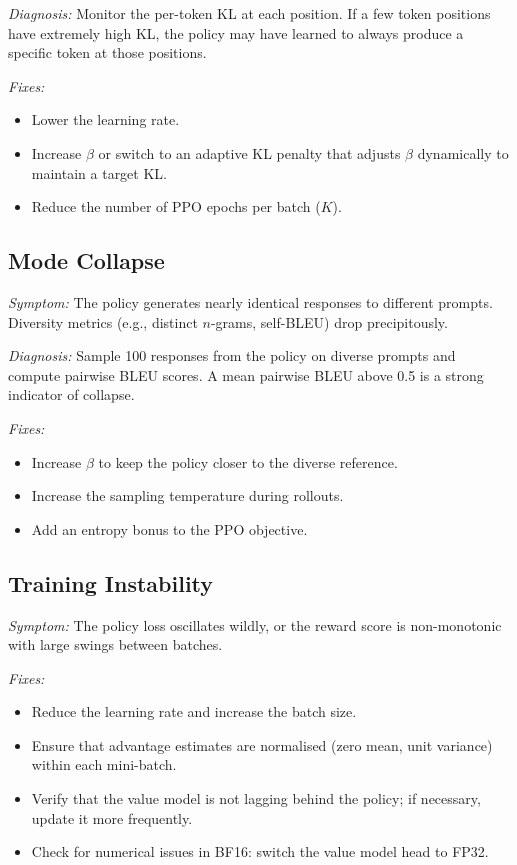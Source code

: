 \emph{Diagnosis:} Monitor the per-token KL at each position. If a few token positions have extremely high KL, the policy may have learned to always produce a specific token at those positions.

\emph{Fixes:}
\begin{itemize}[leftmargin=*]
  \item Lower the learning rate.
  \item Increase $\beta$ or switch to an adaptive KL penalty that adjusts $\beta$ dynamically to maintain a target KL.
  \item Reduce the number of PPO epochs per batch ($K$).
\end{itemize}

\subsection{Mode Collapse}

\emph{Symptom:} The policy generates nearly identical responses to different prompts. Diversity metrics (e.g., distinct $n$-grams, self-BLEU) drop precipitously.

\emph{Diagnosis:} Sample 100 responses from the policy on diverse prompts and compute pairwise BLEU scores. A mean pairwise BLEU above 0.5 is a strong indicator of collapse.

\emph{Fixes:}
\begin{itemize}[leftmargin=*]
  \item Increase $\beta$ to keep the policy closer to the diverse reference.
  \item Increase the sampling temperature during rollouts.
  \item Add an entropy bonus to the PPO objective.
\end{itemize}

\subsection{Training Instability}

\emph{Symptom:} The policy loss oscillates wildly, or the reward score is non-monotonic with large swings between batches.

\emph{Fixes:}
\begin{itemize}[leftmargin=*]
  \item Reduce the learning rate and increase the batch size.
  \item Ensure that advantage estimates are normalised (zero mean, unit variance) within each mini-batch.
  \item Verify that the value model is not lagging behind the policy; if necessary, update it more frequently.
  \item Check for numerical issues in BF16: switch the value model head to FP32.
\end{itemize}

